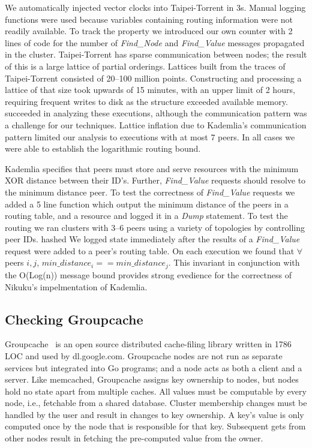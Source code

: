 We automatically injected vector clocks into Taipei-Torrent in 3s.
Manual logging functions were used because variables containing
routing information were not readily available.  
%
To track the property we introduced our own counter with 2 lines of
code for the number of \emph{Find\_Node} and \emph{Find\_Value}
messages propagated in the cluster.
%
Taipei-Torrent has sparse communication between nodes; the result of
this is a large lattice of partial orderings.  Lattices built from the
traces of Taipei-Torrent consisted of 20--100 million points.
Constructing and processing a lattice of that size took upwards
of 15 minutes, with an upper limit of 2 hours, requiring frequent
writes to disk as the structure exceeded available memory. \dinv
succeeded in analyzing these executions, although the communication
pattern was a challenge for our techniques.
%
Lattice inflation due to Kademlia's communication pattern limited our
analysis to executions with at most 7 peers. In all cases we were able
to establish the logarithmic routing bound.

Kademlia specifies that peers must store and serve resources with the
minimum XOR distance between their ID's. Further, \emph{Find\_Value}
requests should resolve to the minimum distance peer.  To test the
correctness of \emph{Find\_Value} requests we added a 5 line function
which output the minimum distance of the peers in a routing table, and
a resource and logged it in a \emph{Dump} statement. To test the
routing we ran clusters with 3--6 peers using a variety of topologies
by controlling peer IDs.  %
hashed
We logged state immediately after the results of a \emph{Find\_Value}
request were added to a peer's routing table. On each execution we
found that $\forall$ peers $i,j$, $min\_distance_i ==
min\_distance_j$. This invariant in conjunction with the O(Log(n))
message bound provides strong evedience for the correctness of
Nikuku's impelmentation of Kademlia.

\subsection{Checking Groupcache}

Groupcache~\cite{groupcache} is an open source distributed
cache-filing library written in 1786 LOC and used by
dl.google.com. Groupcache nodes are not run as separate services but
integrated into Go programs; and a node acts as both a client and a
server. Like memcached, Groupcache assigns key ownership to nodes, but
nodes hold no state apart from multiple caches. All values must be
computable by every node, i.e., fetchable from a shared
database. Cluster membership changes must be handled by the user and
result in changes to key ownership. A key's value is only computed
once by the node that is responsible for that key. Subsequent gets
from other nodes result in fetching the pre-computed value from the
owner.

